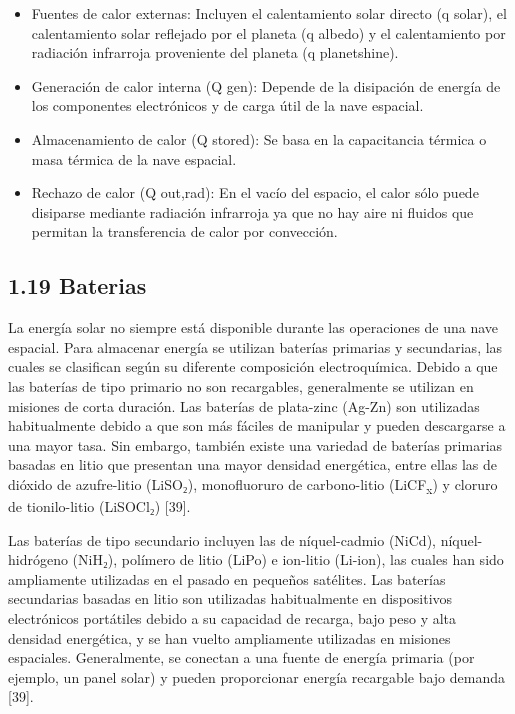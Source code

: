 \documentclass[12pt,a4paper]{article}
\begin{document}
\begin{itemize}
\item
  Fuentes de calor externas: Incluyen el calentamiento solar directo (q solar), el calentamiento solar reflejado por el planeta (q albedo) y el calentamiento por radiación infrarroja proveniente del planeta (q planetshine).
\item
  Generación de calor interna (Q gen): Depende de la disipación de energía de los componentes electrónicos y de carga útil de la nave espacial.
\item
  Almacenamiento de calor (Q stored): Se basa en la capacitancia térmica o masa térmica de la nave espacial.
\item
  Rechazo de calor (Q out,rad): En el vacío del espacio, el calor sólo puede disiparse mediante radiación infrarroja ya que no hay aire ni fluidos que permitan la transferencia de calor por convección.
\end{itemize}

\subsection{1.19 Baterias}\label{baterias}

La energía solar no siempre está disponible durante las operaciones de una nave espacial. Para almacenar energía se utilizan baterías primarias y secundarias, las cuales se clasifican según su diferente composición electroquímica. Debido a que las baterías de tipo primario no son recargables, generalmente se utilizan en misiones de corta duración. Las baterías de plata-zinc (Ag-Zn) son utilizadas habitualmente debido a que son más fáciles de manipular y pueden descargarse a una mayor tasa. Sin embargo, también existe una variedad de baterías primarias basadas en litio que presentan una mayor densidad energética, entre ellas las de dióxido de azufre-litio (LiSO₂), monofluoruro de carbono-litio (LiCF\textsubscript{x}) y cloruro de tionilo-litio (LiSOCl₂) {[}39{]}.

Las baterías de tipo secundario incluyen las de níquel-cadmio (NiCd), níquel-hidrógeno (NiH₂), polímero de litio (LiPo) e ion-litio (Li-ion), las cuales han sido ampliamente utilizadas en el pasado en pequeños satélites. Las baterías secundarias basadas en litio son utilizadas habitualmente en dispositivos electrónicos portátiles debido a su capacidad de recarga, bajo peso y alta densidad energética, y se han vuelto ampliamente utilizadas en misiones espaciales. Generalmente, se conectan a una fuente de energía primaria (por ejemplo, un panel solar) y pueden proporcionar energía recargable bajo demanda {[}39{]}.
\end{document}
